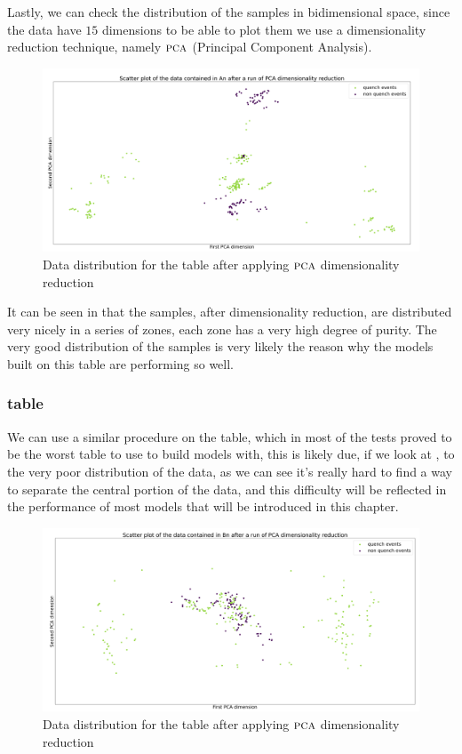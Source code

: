 Lastly, we can check the distribution of the samples in bidimensional space, since the data have
$15$ dimensions to be able to plot them we use a dimensionality reduction technique, namely
$\textsc{pca}$ (Principal Component Analysis).
\begin{figure}[h!]
	\centering
	\includegraphics[width=\linewidth]{img/An_distribution.png}
	\caption{Data distribution for the \an table after applying $\textsc{pca}$ dimensionality
		reduction} \label{fig:an-dist}
\end{figure}

It can be seen in  that the samples, after dimensionality reduction, are distributed very nicely in a series
of zones, each zone has a very high degree of purity. The very good distribution of the samples is
very likely the reason why the models built on this table are performing so well.

\subsubsection{\bn table}
We can use a similar procedure on the \bn table, which in most of the tests proved to be the worst
table to use to build models with, this is likely due, if we look at , to the very
poor distribution of the data, as we can see it's really hard to find a way to separate the central
portion of the data, and this difficulty will be reflected in the performance of most models that
will be introduced in this chapter.
\begin{figure}[h!]
	\centering
	\includegraphics[width=\linewidth]{img/Bn_distribution.png}
	\caption{Data distribution for the \bn table after applying $\textsc{pca}$ dimensionality
		reduction} \label{fig:bn-dist}
\end{figure}

